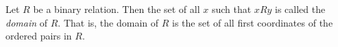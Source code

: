 \documentclass[12pt]{article}
\begin{document}
Let $R$ be a binary relation.  Then the set of all $x$ such that $x R y$ is called the \emph{domain} of $R$.  That is, the domain of $R$ is the set of all first coordinates of the ordered pairs in $R$.
\end{document}
